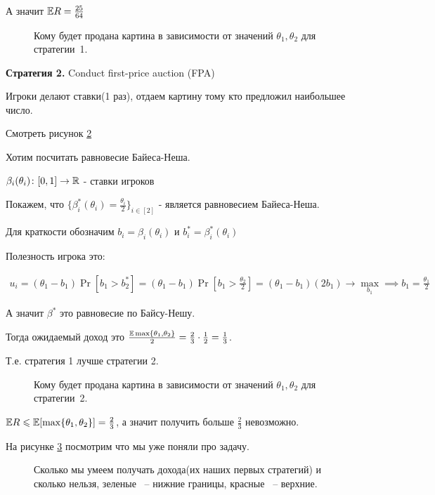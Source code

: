 \begin{exmpl}
	А значит $\mathbb E R = \frac{25}{64}$ 

\begin{figure}[ht]
    \centering
    \caption{Кому будет продана картина в зависимости от значений $\theta_1, \theta_2$ для стратегии~1.}
    \label{fig:rasp_example_3_lec}
\end{figure}

	\textbf{Стратегия 2.} Conduct first-price auction (FPA)

	Игроки делают ставки(1 раз), отдаем картину тому кто предложил наибольшее число.

	Смотреть рисунок \ref{fig:rasp_example_strategy_2_3_lec}

	Хотим посчитать равновесие Байеса-Неша.

	$\beta_i(\theta_i) \colon [0, 1] \to \mathbb{R}$ - ставки игроков

	Покажем, что $\{ \beta_i^*(\theta_i) = \frac{\theta_i}{2}\}_{i\in [2]}$ - является равновесием Байеса-Неша.

	Для краткости обозначим $b_i = \beta_i(\theta_i)$ и $b_i^* = \beta_i^*(\theta_i)$

	Полезность игрока это:


	\begin{align*}
		u_i = (\theta_1 - b_1) \Pr[b_1 > b_2^*] = (\theta_1 - b_1) \Pr\left[b_1 > \frac{\theta_2}{2}\right] = (\theta_1 - b_1)(2 b_1) \to \max_{b_1} \implies b_1 = \frac{\theta_1}{2}
	\end{align*}

	А значит $\beta^*$ это равновесие по Байсу-Нешу.

	Тогда ожидаемый доход это  $\frac{\mathbb E \max\{\theta_1, \theta_2\}}{2} = \frac{2}{3} \cdot \frac{1}{2} = \frac{1}{3}$.


	Т.е. стратегия 1 лучше стратегии 2.

\begin{figure}[ht]
    \centering
    \caption{Кому будет продана картина в зависимости от значений $\theta_1, \theta_2$ для стратегии~2.}
    \label{fig:rasp_example_strategy_2_3_lec}
\end{figure}

$\mathbb E R \leqslant \mathbb E [\max \{\theta_1, \theta_2\}] = \frac{2}{3}$, а значит получить больше $\frac{2}{3}$ невозможно.

На рисунке \ref{fig:rasp_example_line_win_amount} посмотрим что мы уже поняли про задачу.

\begin{figure}[ht]
    \centering
    \caption{Сколько мы умеем получать дохода(их наших первых стратегий) и сколько нельзя, зеленые ~-- нижние границы, красные ~-- верхние.}
    \label{fig:rasp_example_line_win_amount}
\end{figure}


\end{exmpl}
